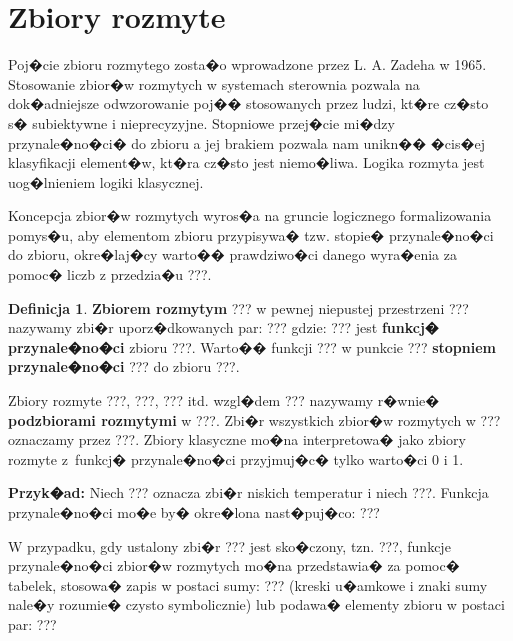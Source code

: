 \documentclass[a4paper,12pt]{article}
\theoremstyle{definition}
\newtheorem{df}{Definicja}
\begin{document}

\section{Zbiory rozmyte}

Poj�cie zbioru rozmytego zosta�o wprowadzone przez L. A. Zadeha w 1965. Stosowanie zbior�w rozmytych w systemach sterownia pozwala na dok�adniejsze odwzorowanie poj�� stosowanych przez ludzi, kt�re cz�sto s� subiektywne i nieprecyzyjne. Stopniowe przej�cie mi�dzy przynale�no�ci� do zbioru a jej brakiem pozwala nam unikn�� �cis�ej klasyfikacji element�w, kt�ra cz�sto jest niemo�liwa. Logika rozmyta jest uog�lnieniem logiki klasycznej. 

Koncepcja zbior�w rozmytych wyros�a na gruncie logicznego formalizowania pomys�u, aby elementom zbioru przypisywa� tzw. stopie� przynale�no�ci do zbioru, okre�laj�cy warto�� prawdziwo�ci danego wyra�enia za pomoc� liczb z przedzia�u ???. 

\begin{df}
\textbf{Zbiorem rozmytym} ??? w pewnej niepustej przestrzeni ??? nazywamy zbi�r uporz�dkowanych par:
???
gdzie:
??? 
jest \textbf{funkcj� przynale�no�ci} zbioru ???.
Warto�� funkcji ??? w punkcie ??? \textbf{stopniem przynale�no�ci} ??? do zbioru ???.
\end{df}


Zbiory rozmyte ???, ???, ??? itd. wzgl�dem ??? nazywamy r�wnie� \textbf{podzbiorami rozmytymi} w ???.
Zbi�r wszystkich zbior�w rozmytych w ??? oznaczamy przez ???. Zbiory klasyczne mo�na interpretowa� jako zbiory rozmyte z~funkcj� przynale�no�ci przyjmuj�c� tylko warto�ci 0 i 1.

\medskip
\noindent
{\bf Przyk�ad:} Niech ??? oznacza zbi�r niskich temperatur i niech ???. Funkcja przynale�no�ci mo�e by� okre�lona nast�puj�co:
???


W przypadku, gdy ustalony zbi�r ??? jest sko�czony, tzn. ???, funkcje przynale�no�ci zbior�w rozmytych mo�na przedstawia� za pomoc� tabelek, stosowa� zapis w postaci sumy:
???
(kreski u�amkowe i znaki sumy nale�y rozumie� czysto symbolicznie) lub podawa� elementy zbioru w postaci par:
???
\end{document}
